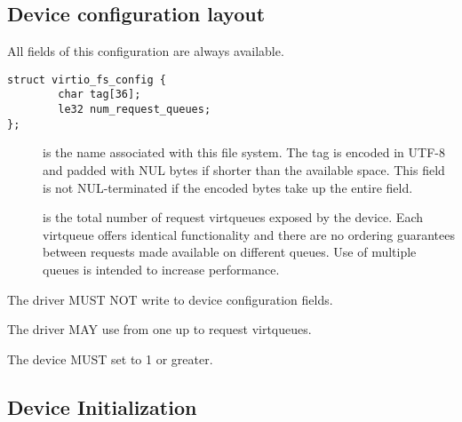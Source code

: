 \subsection{Device configuration layout}\label{sec:Device Types / File System Device / Device configuration layout}

All fields of this configuration are always available.

\begin{lstlisting}
struct virtio_fs_config {
        char tag[36];
        le32 num_request_queues;
};
\end{lstlisting}

\begin{description}
\item[] is the name associated with this file system.  The tag is
    encoded in UTF-8 and padded with NUL bytes if shorter than the
    available space.  This field is not NUL-terminated if the encoded bytes
    take up the entire field.
\item[] is the total number of request virtqueues
    exposed by the device.  Each virtqueue offers identical functionality and
    there are no ordering guarantees between requests made available on
    different queues.  Use of multiple queues is intended to increase
    performance.
\end{description}


The driver MUST NOT write to device configuration fields.

The driver MAY use from one up to  request virtqueues.


The device MUST set  to 1 or greater.

\subsection{Device Initialization}\label{Device Types / File System Device / Device Initialization}

